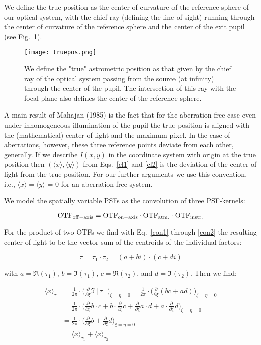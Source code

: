 We define the true position as the center of curvature of the reference sphere of our optical system, with the chief ray (defining the line of sight) running through the center of curvature of the reference sphere and the center of the exit pupil (see Fig.~\ref{fig:tp}).
\begin{figure}[h!]
\centering
\texttt{[image: truepos.png]}
\caption{\label{fig:tp}We define the "true" astrometric position as that given by the chief ray of the optical system passing from the source (at infinity) through the center of the pupil.  The intersection of this ray with the focal plane also defines the center of the reference sphere.}
\end{figure}
A main result of Mahajan (1985) is the fact that for the aberration free case even under inhomogeneous illumination of the pupil the true position is aligned with the (mathematical) center of light and the maximum pixel. In the case of aberrations, however, these three reference points deviate from each other, generally. If we describe $I(x,y)$ in the coordinate system with origin at the true position then $(\langle x \rangle, \langle y \rangle)$ from Eqs.~\ref{cl1} and \ref{cl2} is the deviation of the center of light from the true position. For our further arguments we use this convention, i.e., $\langle x \rangle = \langle y \rangle$ = 0 for an aberration free system.

We model the spatially variable PSFs as the convolution of  three PSF-kernels:

\begin{equation}
\rm{OTF}_{\rm{off-axis}} = \rm{OTF}_{\rm{on-axis}} \cdot \rm{OTF}_{\rm{atm.}} \cdot \rm{OTF}_{\rm{instr.}}
\end{equation}

For the product of two OTFs we find with Eq.~\ref{con1} through \ref{con2} the resulting center of light to be the vector sum of the centroids of the individual factors:

\begin{equation}
\tau  = \tau_1 \cdot \tau_2 = (a + bi)\cdot (c + di)
\end{equation}

with $a = \Re(\tau_1)$, $b = \Im(\tau_1)$, $c = \Re(\tau_2)$, and $d = \Im(\tau_2)$. Then we find:

\begin{align}
\langle x \rangle_{\tau} & = \frac{1}{2\pi} \cdot \Big(\frac{\partial}{\partial\xi}\Im[\tau]\Big)_{\xi = \eta = 0} = \frac{1}{2\pi} \cdot \Big(\frac{\partial}{\partial\xi}(bc+ad)\Big)_{\xi = \eta = 0}\nonumber \\ 
& = \frac{1}{2\pi} \cdot \Big(\frac{\partial}{\partial\xi}b \cdot c + b \cdot \frac{\partial}{\partial\xi}c + \frac{\partial}{\partial\xi}a \cdot d + a \cdot \frac{\partial}{\partial\xi}d\Big)_{\xi = \eta = 0}\nonumber \\
& = \frac{1}{2\pi} \cdot \Big(\frac{\partial}{\partial\xi}b + \frac{\partial}{\partial\xi}d\Big)_{\xi = \eta = 0}\nonumber \\
& = \langle x \rangle_{\tau_1} + \langle x \rangle_{\tau_2}
\end{align}

